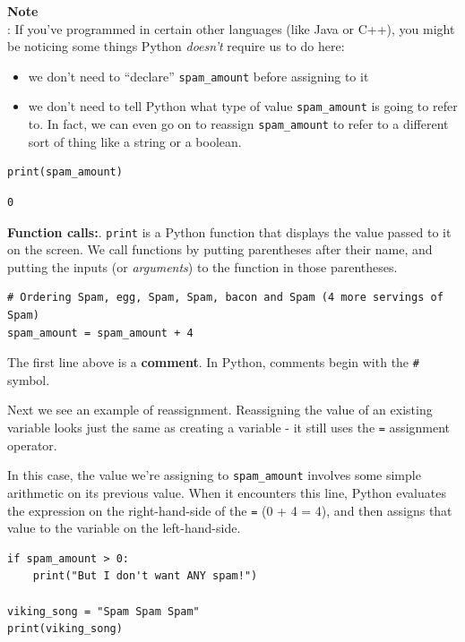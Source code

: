 \begin{framed}
\textbf{Note}\\
: If you've programmed in certain other languages (like Java or C++), you might be noticing some things Python \textit{doesn't} require us to do here:
\end{framed}

\begin{itemize}
\item we don't need to ``declare'' \texttt{spam\_amount} before assigning to it
\item we don't need to tell Python what type of value \texttt{spam\_amount} is going to refer to. In fact, we can even go on to reassign \texttt{spam\_amount} to refer to a different sort of thing like a string or a boolean.
\end{itemize}

\begin{verbatim}
print(spam_amount)
\end{verbatim}

\begin{verbatim}
0
\end{verbatim}

\textbf{Function calls:}. \texttt{print} is a Python function that displays the value passed to it on the screen. We call functions by putting parentheses after their name, and putting the inputs (or \textit{arguments}) to the function in those parentheses.

\begin{verbatim}
# Ordering Spam, egg, Spam, Spam, bacon and Spam (4 more servings of Spam)
spam_amount = spam_amount + 4
\end{verbatim}

The first line above is a \textbf{comment}. In Python, comments begin with the \texttt{\#} symbol.

Next we see an example of reassignment. Reassigning the value of an existing variable looks just the same as creating a variable - it still uses the \texttt{=} assignment operator.

In this case, the value we're assigning to \texttt{spam\_amount} involves some simple arithmetic on its previous value. When it encounters this line, Python evaluates the expression on the right-hand-side of the \texttt{=} (0 + 4 = 4), and then assigns that value to the variable on the left-hand-side.

\begin{verbatim}
if spam_amount > 0:
    print("But I don't want ANY spam!")

viking_song = "Spam Spam Spam"
print(viking_song)
\end{verbatim}

